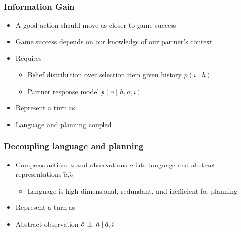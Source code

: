 \documentclass{beamer}
\newcommand{\bigCI}{\mathrel{\text{\scalebox{1.07}{$\perp\mkern-10mu\perp$}}}}
\begin{document}
\begin{frame}
\frametitle{Information Gain}
\begin{itemize}
\item A good action should move us closer to game success
\item Game success depends on our knowledge of our partner's context
\item Requires
    \begin{itemize}
    \item Belief distribution over selection item given history $p(i \mid h)$
    \item Partner response model $p(o \mid h, a, i)$
    \end{itemize}
\item Represent a turn as

\begin{center}
\end{center}
\item Language and planning coupled
\end{itemize}
\end{frame}

\begin{frame}
\frametitle{Decoupling language and planning}
\begin{itemize}
\item Compress actions $a$ and observations $o$ into language and abstract representations
    $\tilde{a}, \tilde{o}$
    \begin{itemize}
    \item Language is high dimensional, redundant, and inefficient for planning
    \end{itemize}
\item Represent a turn as
\begin{center}
\end{center}
\item Abstract observation $\tilde{o} \bigCI h \mid \tilde{a}, i$
\end{itemize}
\end{frame}
\end{document}
